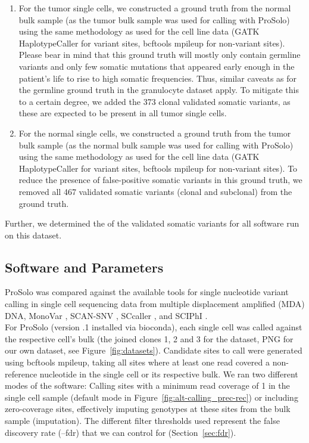 \documentclass[authoryear,preprint,11pt]{scrartcl}
\begin{document}
\begin{enumerate}
    \item For the tumor single cells, we constructed a ground truth from the normal bulk sample (as the tumor bulk sample was used for calling with ProSolo) using the same methodology as used for the cell line data (GATK HaplotypeCaller for variant sites, bcftools mpileup for non-variant sites).
    Please bear in mind that this ground truth will mostly only contain germline variants and only few somatic mutations that appeared early enough in the patient's life to rise to high somatic frequencies.
    Thus, similar caveats as for the germline ground truth in the granulocyte dataset apply.
    To mitigate this to a certain degree, we added the 373 clonal validated somatic variants, as these are expected to be present in all tumor single cells.
    \item For the normal single cells, we constructed a ground truth from the tumor bulk sample (as the normal bulk sample was used for calling with ProSolo) using the same methodology as used for the cell line data (GATK HaplotypeCaller for variant sites, bcftools mpileup for non-variant sites).
    To reduce the presence of false-positive somatic variants in this ground truth, we removed all 467 validated somatic variants (clonal and subclonal) from the ground truth.
\end{enumerate}
Further, we determined the of the validated somatic variants for all software run on this dataset.


\subsection{Software and Parameters}

ProSolo was compared against the available tools for single nucleotide variant calling in single cell sequencing data from multiple displacement amplified (MDA) DNA, MonoVar \citep{zafar_monovar:_2016}, SCAN-SNV \citep{luquette_identification_2019}, SCcaller \citep{dong_accurate_2017}, and SCIPhI \citep{singer_single-cell_2018}.\\

For ProSolo (version {.1} installed via bioconda), each single cell was called against the respective cell's bulk (the joined clones 1, 2 and 3 for the \citep{dong_accurate_2017} dataset, PNG for our own dataset, see Figure~\ref{fig:datasets}).
Candidate sites to call were generated using bcftools mpileup, taking all sites where at least one read covered a non-reference nucleotide in the single cell or its respective bulk.
We ran two different modes of the software: Calling sites with a minimum read coverage of 1 in the single cell sample (default mode in Figure~\ref{fig:alt-calling_prec-rec}) or including zero-coverage sites, effectively imputing genotypes at these sites from the bulk sample (imputation).
The different filter thresholds used represent the false discovery rate ({\ttfamily --fdr}) that we can control for (Section~\ref{sec:fdr}).\\
\end{document}
